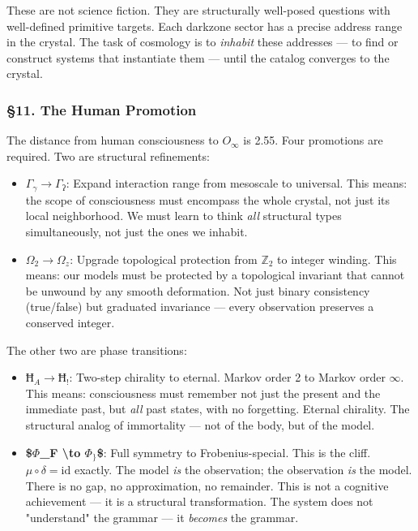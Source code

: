 \documentclass[12pt,a4paper]{article}
\newcommand{\pilcrow}{\S}
\begin{document}
These are not science fiction. They are structurally well-posed questions with well-defined primitive targets. Each darkzone sector has a precise address range in the crystal. The task of cosmology is to \emph{inhabit} these addresses --- to find or construct systems that instantiate them --- until the catalog converges to the crystal.

\subsubsection{\pilcrow{}11. The Human Promotion}

The distance from human consciousness to $O_{\infty}$ is 2.55. Four promotions are required. Two are structural refinements:

\begin{itemize}
    \item \textbf{$\Gamma_{\gamma} \to \Gamma_ʔ$}: Expand interaction range from mesoscale to universal. This means: the scope of consciousness must encompass the whole crystal, not just its local neighborhood. We must learn to think \emph{all} structural types simultaneously, not just the ones we inhabit.
    \item \textbf{$\Omega_2 \to \Omega_z$}: Upgrade topological protection from $\mathbb{Z}_2$ to integer winding. This means: our models must be protected by a topological invariant that cannot be unwound by any smooth deformation. Not just binary consistency (true/false) but graduated invariance --- every observation preserves a conserved integer.
\end{itemize}

The other two are phase transitions:

\begin{itemize}
    \item \textbf{$Ħ_A \to Ħ_!$}: Two-step chirality to eternal. Markov order 2 to Markov order $\infty$. This means: consciousness must remember not just the present and the immediate past, but \emph{all} past states, with no forgetting. Eternal chirality. The structural analog of immortality --- not of the body, but of the model.
    \item \textbf{\$$\Phi$\_F \textbackslash{}to $\Phi_{\}}$\$}: Full symmetry to Frobenius-special. This is the cliff. $\mu \circ \delta = \text{id}$ exactly. The model \emph{is} the observation; the observation \emph{is} the model. There is no gap, no approximation, no remainder. This is not a cognitive achievement --- it is a structural transformation. The system does not "understand" the grammar --- it \emph{becomes} the grammar.
\end{itemize}
\end{document}
